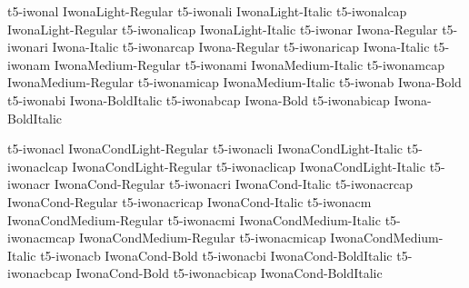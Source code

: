 \documentclass[test]{vnsample}
\begin{document}
\begin{shortsample}
      {t5-iwonal}      {IwonaLight-Regular}
     {t5-iwonali}     {IwonaLight-Italic}
     {t5-iwonalcap}   {IwonaLight-Regular}
   {t5-iwonalicap}  {IwonaLight-Italic}
      {t5-iwonar}      {Iwona-Regular}
     {t5-iwonari}     {Iwona-Italic}
     {t5-iwonarcap}   {Iwona-Regular}
   {t5-iwonaricap}  {Iwona-Italic}
     {t5-iwonam}      {IwonaMedium-Regular}
    {t5-iwonami}     {IwonaMedium-Italic}
    {t5-iwonamcap}   {IwonaMedium-Regular}
  {t5-iwonamicap}  {IwonaMedium-Italic}
      {t5-iwonab}      {Iwona-Bold}
     {t5-iwonabi}     {Iwona-BoldItalic}
     {t5-iwonabcap}   {Iwona-Bold}
   {t5-iwonabicap}  {Iwona-BoldItalic}
\end{shortsample}
\clearpage
\begin{shortsample}
     {t5-iwonacl}     {IwonaCondLight-Regular}
    {t5-iwonacli}    {IwonaCondLight-Italic}
    {t5-iwonaclcap}  {IwonaCondLight-Regular}
  {t5-iwonaclicap} {IwonaCondLight-Italic}
     {t5-iwonacr}     {IwonaCond-Regular}
    {t5-iwonacri}    {IwonaCond-Italic}
    {t5-iwonacrcap}  {IwonaCond-Regular}
  {t5-iwonacricap} {IwonaCond-Italic}
    {t5-iwonacm}     {IwonaCondMedium-Regular}
   {t5-iwonacmi}    {IwonaCondMedium-Italic}
   {t5-iwonacmcap}  {IwonaCondMedium-Regular}
 {t5-iwonacmicap} {IwonaCondMedium-Italic}
     {t5-iwonacb}     {IwonaCond-Bold}
    {t5-iwonacbi}    {IwonaCond-BoldItalic}
    {t5-iwonacbcap}  {IwonaCond-Bold}
  {t5-iwonacbicap} {IwonaCond-BoldItalic}
\end{shortsample}
\end{document}
